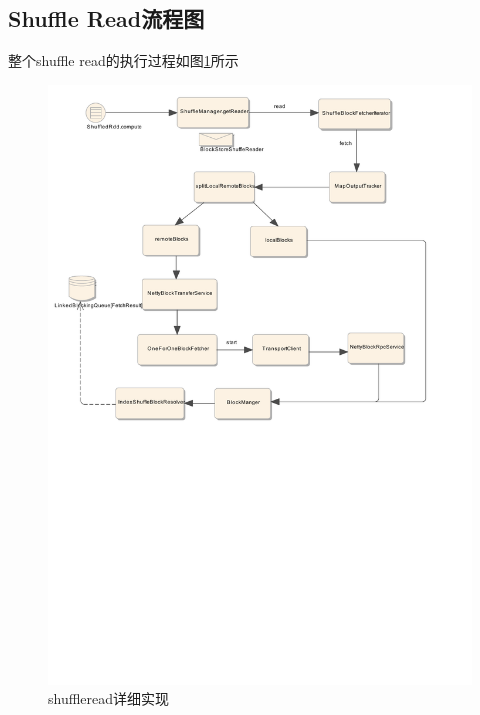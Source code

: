 \subsection{Shuffle Read流程图}
整个shuffle read的执行过程如图\ref{fig:shuffleread}所示
\begin{figure}[H] 
	\centering
	\includegraphics[width=\textwidth]{figures/shuffleRead.pdf}
	\caption{shuffleread详细实现}
	\label{fig:shuffleread}
\end{figure}